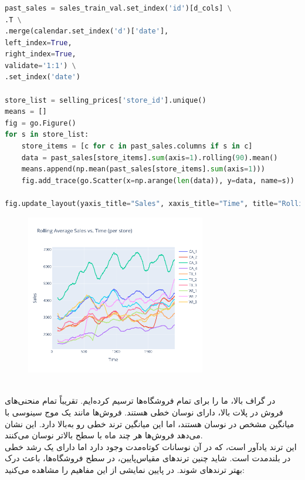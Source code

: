 \documentclass{article}
\begin{document}
\subsubsection*{}
\begin{latin}
\begin{lstlisting}[language=Python]
past_sales = sales_train_val.set_index('id')[d_cols] \
.T \
.merge(calendar.set_index('d')['date'],
left_index=True,
right_index=True,
validate='1:1') \
.set_index('date')

store_list = selling_prices['store_id'].unique()
means = []
fig = go.Figure()
for s in store_list:
	store_items = [c for c in past_sales.columns if s in c]
	data = past_sales[store_items].sum(axis=1).rolling(90).mean()
	means.append(np.mean(past_sales[store_items].sum(axis=1)))
	fig.add_trace(go.Scatter(x=np.arange(len(data)), y=data, name=s))

fig.update_layout(yaxis_title="Sales", xaxis_title="Time", title="Rolling Average Sales vs. Time (per store)")
\end{lstlisting}
\end{latin}
\begin{figure}[hbt!]
	\centering
	\includegraphics[width=\textwidth,height=7cm]{Outputs/12.png}
\end{figure}
\ \\
در گراف بالا، ما \lr{rolling sales} را برای تمام فروشگاه‌ها ترسیم کرده‌ایم. تقریباً  تمام منحنی‌های فروش در پلات بالا، دارای نوسان خطی هستند. فروش‌ها مانند یک موج سینوسی با میانگین مشخص در نوسان هستند، اما این میانگین ترند خطی رو به‌بالا دارد. این نشان می‌دهد فروش‌ها هر چند ماه با سطح بالاتر نوسان می‌کنند.\\
این ترند یادآور  است، که در آن نوسانات کوتاه‌مدت وجود دارد اما دارای یک رشد خطی در بلند‌مدت است. شاید چنین ترندهای مقیاس‌پایین، در سطح فروشگاه‌ها، باعث درک بهتر ترندهای  شوند. در پایین نمایشی از این مفاهیم را مشاهده می‌کنید:
\end{document}
